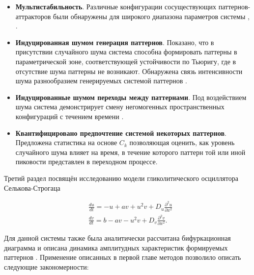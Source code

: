 \begin{itemize}
    \item \textbf{Мультистабильность}. Различные конфигурации сосуществующих паттернов-аттракторов были обнаружены для широкого диапазона параметров системы \cite{bib3}, \cite{bib4}.
    \item \textbf{Индуцированная шумом генерация паттернов}. Показано, что в присутствии случайного шума система способна формировать паттерны в параметрической зоне, соответствующей устойчивости по Тьюригу, где в отсутствие шума паттерны не возникают. Обнаружена связь интенсивности шума разнообразием генерируемых системой паттернов \cite{bib3}.
    \item \textbf{Индуцированные шумом переходы между паттернами}. Под воздействием шума система демонстрирует смену негомогенных пространственных конфигураций с течением времени \cite{bib4}.
    \item \textbf{Квантифицировано предпочтение системой некоторых паттернов}. Предложена статистика на основе $C_k$ позволяющая оценить, как уровень случайного шума влияет на время, в течение которого паттерн той или иной пиковости представлен в переходном процессе.
\end{itemize}

Третий раздел посвящён исследованию модели гликолитического осциллятора Селькова-Строгаца

\begin{equation}
    \begin{aligned}
        & \frac{d u}{d t}=-u+a v+u^2 v+D_u \frac{\partial^2 u}{\partial x^2} \\
        & \frac{d v}{d t}=b-a v-u^2 v+D_v \frac{\partial^2 v}{\partial x^2}.
        \end{aligned}
\end{equation}

Для данной системы также была аналитически рассчитана бифуркационная диаграмма и описана динамика амплитудных характеристик формируемых паттернов \cite{bib5}. Применение описанных в первой главе методов позволило описать следующие закономерности:

